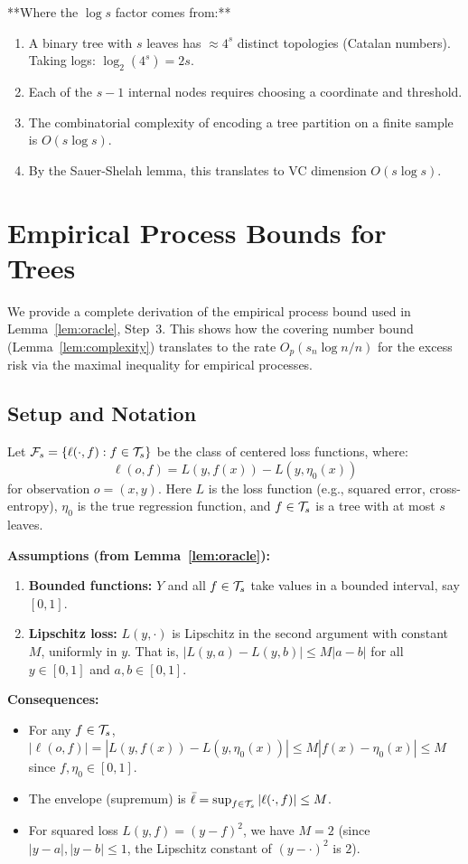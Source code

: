 \documentclass[12pt]{article}
\begin{document}
**Where the $\log s$ factor comes from:**
\begin{enumerate}
\item A binary tree with $s$ leaves has $\approx 4^s$ distinct topologies (Catalan numbers). Taking logs: $\log_2(4^s) = 2s$.
\item Each of the $s-1$ internal nodes requires choosing a coordinate and threshold.
\item The combinatorial complexity of encoding a tree partition on a finite sample is $O(s \log s)$.
\item By the Sauer-Shelah lemma, this translates to VC dimension $O(s \log s)$.
\end{enumerate}

\section{Empirical Process Bounds for Trees}
\label{app:empirical-process}

We provide a complete derivation of the empirical process bound used in Lemma~\ref{lem:oracle}, Step~3. This shows how the covering number bound (Lemma~\ref{lem:complexity}) translates to the rate $O_p(s_n \log n / n)$ for the excess risk via the maximal inequality for empirical processes.

\subsection{Setup and Notation}

Let $\mathcal{F}_s = \{ \ell(\cdot, f) : f \in \mathcal{T}_s \}$ be the class of centered loss functions, where:
\[
\ell(o, f) = L(y, f(x)) - L(y, \eta_0(x))
\]
for observation $o = (x,y)$. Here $L$ is the loss function (e.g., squared error, cross-entropy), $\eta_0$ is the true regression function, and $f \in \mathcal{T}_s$ is a tree with at most $s$ leaves.

\textbf{Assumptions (from Lemma~\ref{lem:oracle}):}
\begin{enumerate}
\item \textbf{Bounded functions:} $Y$ and all $f \in \mathcal{T}_s$ take values in a bounded interval, say $[0,1]$.
\item \textbf{Lipschitz loss:} $L(y, \cdot)$ is Lipschitz in the second argument with constant $M$, uniformly in $y$. That is, $|L(y, a) - L(y, b)| \le M |a - b|$ for all $y \in [0,1]$ and $a, b \in [0,1]$.
\end{enumerate}

\textbf{Consequences:}
\begin{itemize}
\item For any $f \in \mathcal{T}_s$, $|\ell(o, f)| = |L(y, f(x)) - L(y, \eta_0(x))| \le M |f(x) - \eta_0(x)| \le M$ since $f, \eta_0 \in [0,1]$.
\item The envelope (supremum) is $\bar{\ell} = \sup_{f \in \mathcal{T}_s} |\ell(\cdot, f)| \le M$.
\item For squared loss $L(y, f) = (y - f)^2$, we have $M = 2$ (since $|y - a|, |y - b| \le 1$, the Lipschitz constant of $(y - \cdot)^2$ is $2$).
\end{itemize}
\end{document}
